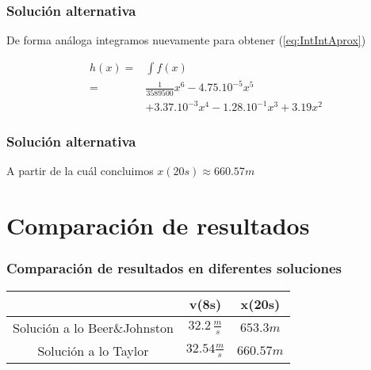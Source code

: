 \documentclass[11pt]{beamer}
\begin{document}
	\begin{frame}
		\frametitle{Solución alternativa}
		De forma análoga integramos nuevamente para obtener (\ref{eq:IntIntAprox})
		
		\begin{align} \label{eq:IntIntAprox}
		h(x) =& \int f(x)\\
		     =&\frac{1}{3589500} x^{6} - 4.75\text{.}10^{-5} x^5 \nonumber\\
		     &+ 3.37\text{.}10^{-3} x^4 - 1.28\text{.}10^{-1} x^3 + 3.19 x^2 \nonumber
		\end{align}
	\end{frame}

	\begin{frame}
		\frametitle{Solución alternativa}
		
		A partir de la cuál concluimos $x(20s) \approx 660.57m$
	\end{frame}

	\section{Comparación de resultados}
	\begin{frame}
		\frametitle{Comparación de resultados en diferentes soluciones}
	
		\begin{table}
			\centering
			\begin{tabular}{c|cc}
				&v(8s)&x(20s)\\
				\hline
				Solución a lo Beer\&Johnston&$32.2 \, \frac{m}{s}$&$653.3m$\\
				Solución a lo Taylor&$32.54\frac{m}{s}$&$660.57m$\\
			\end{tabular}
		\end{table}
	\end{frame}
	
\end{document}
